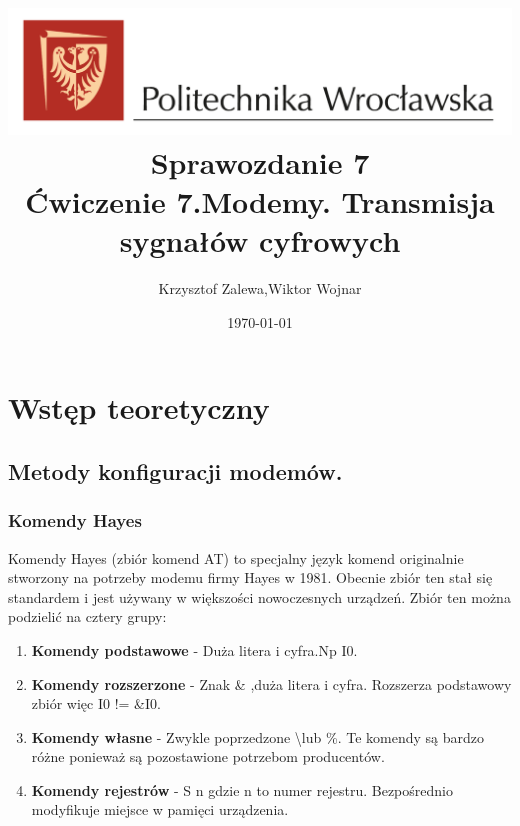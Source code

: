 \documentclass{article}
\title{
  \centering
  \includegraphics[width=\textwidth]{images/logo_PWr_kolor_poziom.png}\\
  \fontsize{28pt}{30pt}\selectfont Sprawozdanie 7\\
  \fontsize{14pt}{30pt}\selectfont Ćwiczenie 7.Modemy. Transmisja sygnałów cyfrowych}
\author{Krzysztof Zalewa,Wiktor Wojnar}
\date{\daymonthyear\today}
\begin{document}
    \maketitle
    \pagebreak
    \tableofcontents
    \FloatBarrier
    \section{Wstęp teoretyczny}
        \subsection{Metody konfiguracji modemów.}
            \subsubsection{Komendy Hayes}
                Komendy Hayes (zbiór komend AT) to specjalny język komend originalnie stworzony
                na potrzeby modemu firmy Hayes w 1981. Obecnie zbiór ten stał się standardem
                i jest używany w większości nowoczesnych urządzeń. Zbiór ten można podzielić na 
                cztery grupy:
                \begin{enumerate}
                    \item \textbf{Komendy podstawowe} - Duża litera i cyfra.Np I0.
                    \item \textbf{Komendy rozszerzone} - Znak \& ,duża litera i cyfra. Rozszerza podstawowy 
                        zbiór więc I0 != \&I0.
                    \item \textbf{Komendy własne} - Zwykle poprzedzone \textbackslash lub \%. Te komendy są 
                        bardzo różne ponieważ są pozostawione potrzebom producentów.
                    \item \textbf{Komendy rejestrów} - S n gdzie n to numer rejestru. Bezpośrednio modyfikuje
                        miejsce w pamięci urządzenia.
                \end{enumerate}
\end{document}
